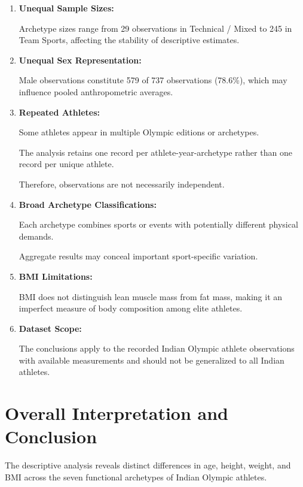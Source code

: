 \documentclass[11pt,a4paper]{article}
\begin{document}
\begin{enumerate}[leftmargin=*]

\item \textbf{Unequal Sample Sizes:}

Archetype sizes range from 29 observations
in Technical / Mixed to 245 in Team Sports,
affecting the stability of descriptive estimates.

\item \textbf{Unequal Sex Representation:}

Male observations constitute 579 of 737
observations (78.6\%), which may influence
pooled anthropometric averages.

\item \textbf{Repeated Athletes:}

Some athletes appear in multiple Olympic
editions or archetypes.

The analysis retains one record per
athlete-year-archetype rather than one record
per unique athlete.

Therefore, observations are not necessarily
independent.

\item \textbf{Broad Archetype Classifications:}

Each archetype combines sports or events
with potentially different physical demands.

Aggregate results may conceal important
sport-specific variation.

\item \textbf{BMI Limitations:}

BMI does not distinguish lean muscle mass
from fat mass, making it an imperfect measure
of body composition among elite athletes.

\item \textbf{Dataset Scope:}

The conclusions apply to the recorded Indian
Olympic athlete observations with available
measurements and should not be generalized
to all Indian athletes.

\end{enumerate}


\section{Overall Interpretation and Conclusion}

The descriptive analysis reveals distinct
differences in age, height, weight, and BMI
across the seven functional archetypes
of Indian Olympic athletes.
\end{document}
